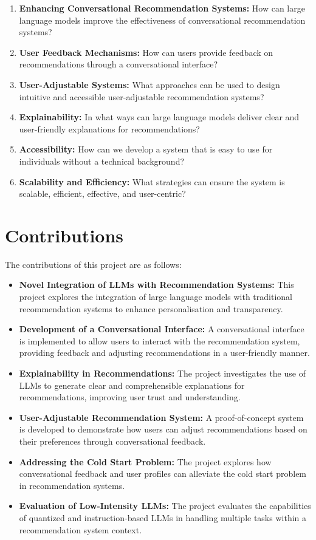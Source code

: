 \begin{enumerate}
    \item \textbf{Enhancing Conversational Recommendation Systems:} How can large language models improve the effectiveness of conversational recommendation systems?
    \item \textbf{User Feedback Mechanisms:} How can users provide feedback on recommendations through a conversational interface?
    \item \textbf{User-Adjustable Systems:} What approaches can be used to design intuitive and accessible user-adjustable recommendation systems?
    \item \textbf{Explainability:} In what ways can large language models deliver clear and user-friendly explanations for recommendations?
    \item \textbf{Accessibility:} How can we develop a system that is easy to use for individuals without a technical background?
    \item \textbf{Scalability and Efficiency:} What strategies can ensure the system is scalable, efficient, effective, and user-centric?
\end{enumerate}


\section{Contributions}
\label{sec:contributions}
The contributions of this project are as follows:

\begin{itemize}
    \item \textbf{Novel Integration of LLMs with Recommendation Systems:} This project explores the integration of large language models with traditional recommendation systems to enhance personalisation and transparency.
    \item \textbf{Development of a Conversational Interface:} A conversational interface is implemented to allow users to interact with the recommendation system, providing feedback and adjusting recommendations in a user-friendly manner.
    \item \textbf{Explainability in Recommendations:} The project investigates the use of LLMs to generate clear and comprehensible explanations for recommendations, improving user trust and understanding.
    \item \textbf{User-Adjustable Recommendation System:} A proof-of-concept system is developed to demonstrate how users can adjust recommendations based on their preferences through conversational feedback.
    \item \textbf{Addressing the Cold Start Problem:} The project explores how conversational feedback and user profiles can alleviate the cold start problem in recommendation systems.
    \item \textbf{Evaluation of Low-Intensity LLMs:} The project evaluates the capabilities of quantized and instruction-based LLMs in handling multiple tasks within a recommendation system context.
\end{itemize}


